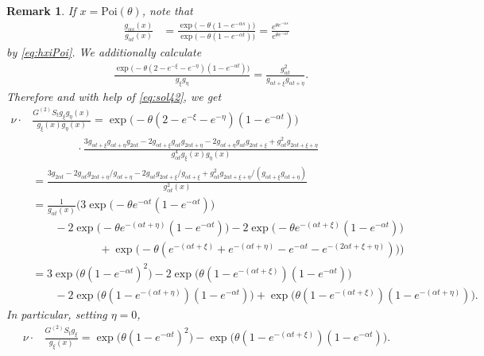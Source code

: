 \documentclass{imsart}
\theoremstyle{plain}
\newtheorem{remark}[theorem]{Remark}
\theoremstyle{definition}
\begin{document}
\begin{remark}\label{rem:GSPoi}
    If $x = \text{Poi}(\theta)$, note that 
    \begin{align*}
        \frac{g_{\alpha s}(x)}{g_{\alpha t}(x)} & = \frac{\exp\Big(-\theta(1 - e^{-\alpha s}) \Big)}{\exp\Big(-\theta(1 - e^{-\alpha t}) \Big)} = \frac{e^{\theta e^{-\alpha s}}}{e^{\theta e^{-\alpha t}}}
    \end{align*}
    by \eqref{eq:hxiPoi}. We additionally calculate
    \begin{align*}
    &\frac{\exp\Big(-\theta(2-e^{- \xi}-e^{-\eta})(1-e^{-\alpha t})\Big)
    }{g_{\xi} g_{\eta}}
    = \frac{g_{\alpha t}^2}{g_{\alpha t +\xi}g_{\alpha t+\eta}}.
\end{align*}
    Therefore and with help of \eqref{eq:sol42}, we get
    \begin{equation}
    \begin{aligned}
    \label{eq:sol42Poi}
    \nu \cdot & \frac{G^{(2)}S_t g_{\xi} g_{\eta}(x)}{g_{\xi}(x) g_{ \eta}(x)} = \exp\Big(-\theta(2-e^{- \xi} - e^{- \eta})(1-e^{-\alpha t})\Big)  \\ 
   & \qquad \qquad \cdot %
    \frac{
    3g_{\alpha  t + \xi} g_{\alpha t + \eta}g_{2\alpha t} - 2 g_{\alpha t + \xi} g_{\alpha t}g_{2\alpha t + \eta} - 2 g_{\alpha t + \eta} g_{\alpha t} g_{2\alpha t+\xi} + g_{\alpha t}^2 g_{2\alpha t+\xi+\eta}}{g_{\alpha t}^4 g_{ \xi}(x) g_{ \eta}(x)} \\
    &=  \frac{3g_{2\alpha t} - 2 g_{\alpha t}g_{2\alpha t + \eta} / g_{\alpha t + \eta} - 2 g_{\alpha t} g_{2\alpha t+\xi} / g_{\alpha t + \xi} + g_{\alpha t}^2 g_{2\alpha t+\xi+\eta}/ (g_{\alpha t + \xi} g_{\alpha t + \eta}) }{g_{\alpha t}^2(x)} \\ 
    & = \frac{1}{g_{\alpha t}(x)}\Big( 3 \exp\Big( -\theta e^{-\alpha t}(1 - e^{-\alpha t})\Big) \\ & \qquad - 2 \exp\Big( - \theta e^{-(\alpha t + \eta)}(1 - e^{-\alpha  t})\Big) - 2\exp\Big(  - \theta e^{-(\alpha t + \xi)}(1 - e^{-\alpha t}) \Big) \\ &  \qquad \qquad \qquad + \exp\Big( -\theta(e^{-(\alpha t + \xi)} + e^{-(\alpha t + \eta)} -e^{-\alpha t} - e^{-(2\alpha t + \xi + \eta)} ) \Big) \Big) \\ & = 3 \exp\Big(\theta(1 - e^{-\alpha t})^2 \Big) - 2 \exp\Big(\theta(1 - e^{-(\alpha t + \xi)})(1 - e^{-\alpha t}) \Big) \\ & \qquad - 2 \exp\Big(\theta(1 - e^{-(\alpha t + \eta)})(1 - e^{-\alpha t}) \Big) + \exp\Big( \theta(1 - e^{-(\alpha t + \xi)})(1 - e^{-(\alpha t + \eta)})\Big).
    \end{aligned}
    \end{equation}
    In particular, setting $\eta=0$,
    \begin{equation}
    \begin{aligned}
    \nu \cdot & \frac{G^{(2)}S_t g_{ \xi} }{g_{ \xi}(x)} = \exp\Big(\theta(1 - e^{-\alpha t})^2 \Big) -  \exp\Big(\theta(1 - e^{-(\alpha t + \xi)})(1 - e^{-\alpha t}) \Big).
    \end{aligned}
    \end{equation}
\end{remark}
\end{document}
